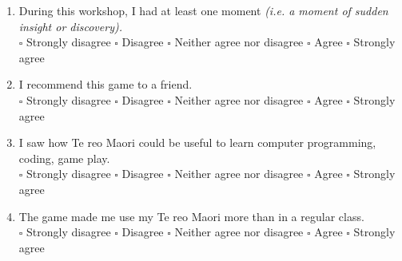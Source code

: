 \documentclass[12pt]{article}\pagestyle{myheadings}
\theoremstyle{plain}
\begin{document}
\begin{mdframed}
\begin{enumerate}
\item During this workshop, I had at least one  moment \textit{(i.e. a moment of sudden insight or discovery).} \\
$\square$ Strongly disagree $\square$ Disagree $\square$ Neither agree nor disagree $\square$ Agree $\square$ Strongly agree

\item I recommend this game to a friend. \\
$\square$ Strongly disagree $\square$ Disagree $\square$ Neither agree nor disagree $\square$ Agree $\square$ Strongly agree

\item I saw how Te reo Maori could be useful to learn computer programming, coding, game play. \\
$\square$ Strongly disagree $\square$ Disagree $\square$ Neither agree nor disagree $\square$ Agree $\square$ Strongly agree


\item The game made me use my Te reo Maori more than in a regular class.\\
$\square$ Strongly disagree $\square$ Disagree $\square$ Neither agree nor disagree $\square$ Agree $\square$ Strongly agree\\



\end{enumerate}
\end{mdframed}
\end{document}
